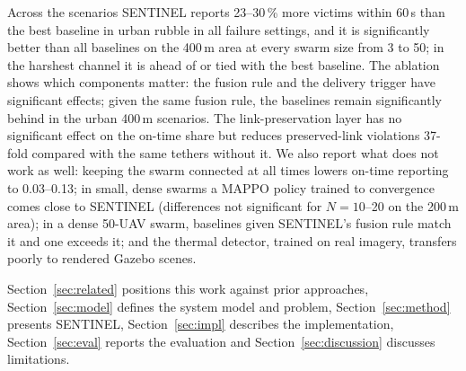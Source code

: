 Across the scenarios SENTINEL reports 23--30\,\% more victims within 60\,s than the best baseline in
urban rubble in all failure settings, and it is significantly better than all baselines on the
400\,m area at every swarm size from 3 to 50; in the harshest channel it is ahead of or tied with the
best baseline. The ablation shows which components matter: the fusion rule and the delivery trigger have
significant effects; given the same fusion rule, the baselines remain significantly behind in the
urban 400\,m scenarios. The
link-preservation layer has no significant effect on the on-time share but reduces preserved-link
violations 37-fold compared with the same tethers without it. We
also report what does not work as well: keeping the swarm connected at all times lowers on-time
reporting to 0.03--0.13; in small, dense swarms a MAPPO policy trained to convergence comes close to
SENTINEL (differences not significant for $N=10$--20 on the 200\,m area); in a dense 50-UAV swarm,
baselines given SENTINEL's fusion rule match it and one exceeds it; and the thermal detector,
trained on real imagery, transfers poorly to rendered Gazebo scenes.

Section~\ref{sec:related} positions this work against prior approaches,
Section~\ref{sec:model} defines the system model and problem, Section~\ref{sec:method} presents
SENTINEL, Section~\ref{sec:impl} describes the implementation, Section~\ref{sec:eval} reports the
evaluation and Section~\ref{sec:discussion} discusses limitations.

